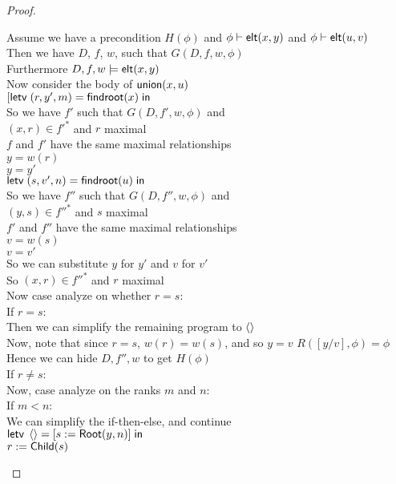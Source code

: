 \begin{proof}
\begin{tabbedproof}
\oo Assume we have a precondition $H(\phi)$ and ${\phi} \vdash \mathsf{elt}({x}, {y})$ and ${\phi} \vdash \mathsf{elt}({u}, {v})$\\
\ooo Then we have $D$, $f$, $w$, such that $G(D, f, w, \phi)$ \\
\ooo Furthermore $D, f, w \models \mathsf{elt}({x}, {y})$ \\
\ooo Now consider the body of $\mathsf{union}(x,u)$ \\
\ooo $[\mathsf{letv}\;(r,y',m) = \mathsf{findroot}(x)\;\mathsf{in}\;$ \\
\ooo So we have $f'$ such that $G(D, f', w, \phi)$ and \\
\ooox  $(x, r) \in f'^*$ and $r$ maximal \\
\ooox  $f$ and $f'$ have the same maximal relationships \\
\ooox  $y = w(r)$ \\
\ooox  $y = y'$ \\
\ooo $\mathsf{letv}\;(s,v',n) = \mathsf{findroot}(u)\;\mathsf{in}\;$ \\
\ooo So we have $f''$ such that $G(D, f'', w, \phi)$ and \\
\ooox  $(y, s) \in f''^*$ and $s$ maximal \\
\ooox  $f'$ and $f''$ have the same maximal relationships \\
\ooox  $v = w(s)$ \\
\ooox  $v = v'$ \\
\ooo So we can substitute $y$ for $y'$ and $v$ for $v'$ \\
\ooo So $(x, r) \in f''^*$ and $r$ maximal \\
\ooo Now case analyze on whether $r = s$: \\
\ooo If $r = s$: \\
\oooo Then we can simplify the remaining program to $\left<\right>$ \\
\oooo Now, note that since $r = s$, $w(r) = w(s)$, and so $y = v$ $R([y/v], \phi) = \phi$ \\
\oooo Hence we can hide $D, f'', w$ to get $H(\phi)$ \\
\ooo If $r \not= s$: \\
\oooo Now, case analyze on the ranks $m$ and $n$: \\
\oooo If $m < n$: \\
\ooooo We can simplify the if-then-else, and continue \\
\ooooo $\mathsf{letv}\;\left<\right> = [s := \mathsf{Root}(y, n)]\;\mathsf{in}\;$ \\
\ooooo $r := \mathsf{Child}(s)$ \\

\end{tabbedproof}
\end{proof}
